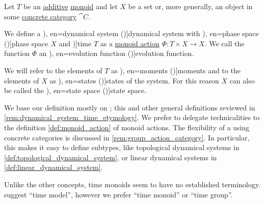 \begin{definition}\label{def:dynamical_system}\mimprovised
  Let \( T \) be an \hyperref[con:additive_semigroup]{additive} \hyperref[def:monoid]{monoid} and let \( X \) be a set or, more generally, an object in some \hyperref[def:concrete_category]{concrete category} \( \cat{C} \).

  We define a \term[ru=динамическая система (\cite[5]{Юмагулов2015ДинамическиеСистемы}), en=dynamical system (\cite[362]{Rozikov2012MultiDimensionalTimeDynamicalSystem})]{dynamical system} with \term[ru=фазовое пространство (\cite[5]{Юмагулов2015ДинамическиеСистемы}), en=phase space (\cite[362]{Rozikov2012MultiDimensionalTimeDynamicalSystem})]{phase space} \( X \) and \term[en=time (\cite[1]{HasselblattKatok1995DynamicalSystems})]{time} \( T \) as a \hyperref[def:monoid_action]{monoid action} \( \Phi: T \times X \to X \). We call the function \( \Phi \) an \term[ru=оператор эволюции (\cite[5]{Юмагулов2015ДинамическиеСистемы}), en=evolution function (\cite[362]{Rozikov2012MultiDimensionalTimeDynamicalSystem})]{evolution function}.

  We will refer to the elements of \( T \) as \term[ru=моменты (\cite[5]{Юмагулов2015ДинамическиеСистемы}), en=moments (\cite[2]{HasselblattKatok1995DynamicalSystems})]{moments} and to the elements of \( X \) as \term[ru=состояния (\cite[5]{Юмагулов2015ДинамическиеСистемы}), en=states (\cite[2]{HasselblattKatok1995DynamicalSystems})]{states} of the system. For this reason \( X \) can also be called the \term[ru=пространство состояний (\cite[5]{Юмагулов2015ДинамическиеСистемы}), en=state space (\cite[362]{Rozikov2012MultiDimensionalTimeDynamicalSystem})]{state space}.
\end{definition}
\begin{comments}
  \item We base our definition mostly on ; this and other general definitions reviewed in \cref{rem:dynamical_system_time_etymology}. We prefer to delegate technicalities to the definition \cref{def:monoid_action} of monoid actions. The flexibility of a using concrete categories is discussed in \cref{rem:group_action_category}. In particular, this makes it easy to define subtypes, like topological dynamical systems in \cref{def:topological_dynamical_system}, or linear dynamical systems in \cref{def:linear_dynamical_system}.

  \item Unlike the other concepts, time monoids seem to have no established terminology.  suggest \enquote{time model}, however we prefer \enquote{time monoid} or \enquote{time group}.
\end{comments}

